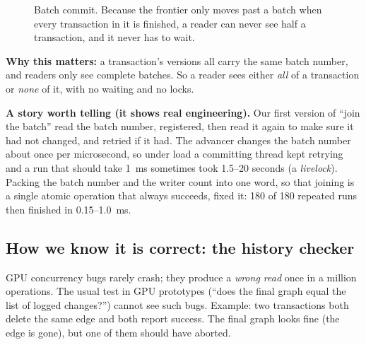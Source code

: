 \documentclass[11pt,a4paper]{article}
\begin{document}
\begin{figure}[H]
\centering
{}
\caption{Batch commit. Because the frontier only moves past a batch when every transaction in it is finished, a reader
can never see half a transaction, and it never has to wait.}
\label{fig:epochs}
\end{figure}

\textbf{Why this matters:} a transaction's versions all carry the same batch number, and readers only see complete
batches. So a reader sees either \emph{all} of a transaction or \emph{none} of it, with no waiting and no locks.

\textbf{A story worth telling (it shows real engineering).} Our first version of ``join the batch'' read the batch number,
registered, then read it again to make sure it had not changed, and retried if it had. The advancer changes the batch
number about once per microsecond, so under load a committing thread kept retrying and a run that should take 1~ms
sometimes took 1.5--20 seconds (a \emph{livelock}). Packing the batch number and the writer count into one word, so that
joining is a single atomic operation that always succeeds, fixed it: 180 of 180 repeated runs then finished in
0.15--1.0~ms.

\subsection{How we know it is correct: the history checker}
GPU concurrency bugs rarely crash; they produce a \emph{wrong read} once in a million operations. The usual test in GPU
prototypes (``does the final graph equal the list of logged changes?'') cannot see such bugs. Example: two
transactions both delete the same edge and both report success. The final graph looks fine (the edge is gone), but
one of them should have aborted.
\end{document}
